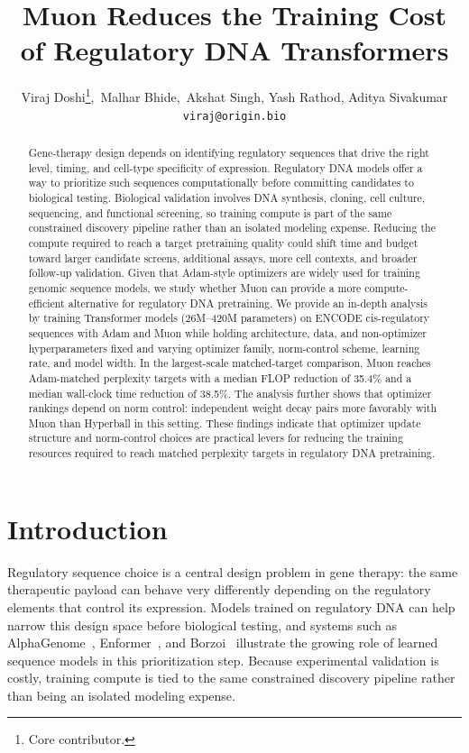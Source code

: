 \documentclass{article}
\title{Muon Reduces the Training Cost of Regulatory DNA Transformers}
\author{%
  \mdseries
  Viraj Doshi\thanks{Core contributor.},\,
  Malhar Bhide,\,
  Akshat Singh,
  Yash Rathod,
  Aditya Sivakumar \\
  \texttt{viraj@origin.bio}
}
\begin{document}
\maketitle

\begin{abstract}
Gene-therapy design depends on identifying regulatory sequences that drive the right level, timing, and cell-type specificity of expression. Regulatory DNA models offer a way to prioritize such sequences computationally before committing candidates to biological testing. Biological validation involves DNA synthesis, cloning, cell culture, sequencing, and functional screening, so training compute is part of the same constrained discovery pipeline rather than an isolated modeling expense. Reducing the compute required to reach a target pretraining quality could shift time and budget toward larger candidate screens, additional assays, more cell contexts, and broader follow-up validation. Given that Adam-style optimizers are widely used for training genomic sequence models, we study whether Muon can provide a more compute-efficient alternative for regulatory DNA pretraining. We provide an in-depth analysis by training Transformer models (26M--420M parameters) on ENCODE cis-regulatory sequences with Adam and Muon while holding architecture, data, and non-optimizer hyperparameters fixed and varying optimizer family, norm-control scheme, learning rate, and model width. In the largest-scale matched-target comparison, Muon reaches Adam-matched perplexity targets with a median FLOP reduction of 35.4\% and a median wall-clock time reduction of 38.5\%. The analysis further shows that optimizer rankings depend on norm control: independent weight decay pairs more favorably with Muon than Hyperball in this setting. These findings indicate that optimizer update structure and norm-control choices are practical levers for reducing the training resources required to reach matched perplexity targets in regulatory DNA pretraining.\end{abstract}

\section{Introduction}
\label{sec:intro}

Regulatory sequence choice is a central design problem in gene therapy: the same therapeutic payload can behave very differently depending on the regulatory elements that control its expression. Models trained on regulatory DNA can help narrow this design space before biological testing, and systems such as AlphaGenome~\citep{alphagenome}, Enformer~\citep{enformer}, and Borzoi~\citep{borzoi} illustrate the growing role of learned sequence models in this prioritization step. Because experimental validation is costly, training compute is tied to the same constrained discovery pipeline rather than being an isolated modeling expense.
\end{document}
